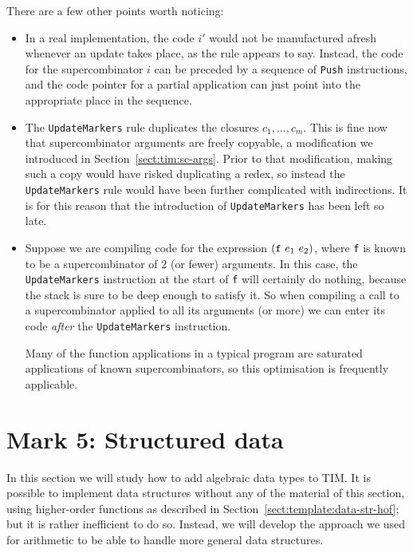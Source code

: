 There are a few other points worth noticing:
\begin{itemize}
\item
In a real implementation, the code $i'$ would not be manufactured afresh
whenever an update takes place, as the rule appears to say.
Instead, the code for the supercombinator $i$ can be preceded by a sequence
of \mbox{\tt Push} instructions, and the code pointer for a partial application
can just point into the appropriate place in the sequence.

\item
The \mbox{\tt UpdateMarkers} rule duplicates the closures $c_1, \ldots, c_m$.
This is fine now that supercombinator arguments are freely copyable,
a modification we introduced in Section~\ref{sect:tim:sc-args}.
Prior to that modification, making such a copy would have risked duplicating
a redex, so instead the \mbox{\tt UpdateMarkers} rule would have been
further complicated with indirections.  It is for this reason that
the introduction of \mbox{\tt UpdateMarkers} has been left so late.

\item
Suppose we are compiling code for the expression $(\mbox{\tt f}~ e_1~ e_2)$, where
\mbox{\tt f} is known to be a supercombinator of 2 (or fewer) arguments.
In this case, the \mbox{\tt UpdateMarkers} instruction at the start of \mbox{\tt f} will
certainly do nothing, because the stack is sure to be deep enough
to satisfy it.
So when compiling a call to a supercombinator applied to all its
arguments (or more) we can enter its code {\em after\/} the \mbox{\tt UpdateMarkers}
instruction.

Many of the function applications in a typical program are saturated
applications of known supercombinators, so this optimisation is frequently
applicable.
\end{itemize}

\section{Mark 5: Structured data}

In this section we will study how to add
algebraic data types to TIM.  It is possible to implement data structures
without any of the material of this section, using higher-order functions
as described in Section~\ref{sect:template:data-str-hof}; but it is
rather inefficient to do so.  Instead, we will develop the
approach we used for arithmetic to be able to handle more general data
structures.

